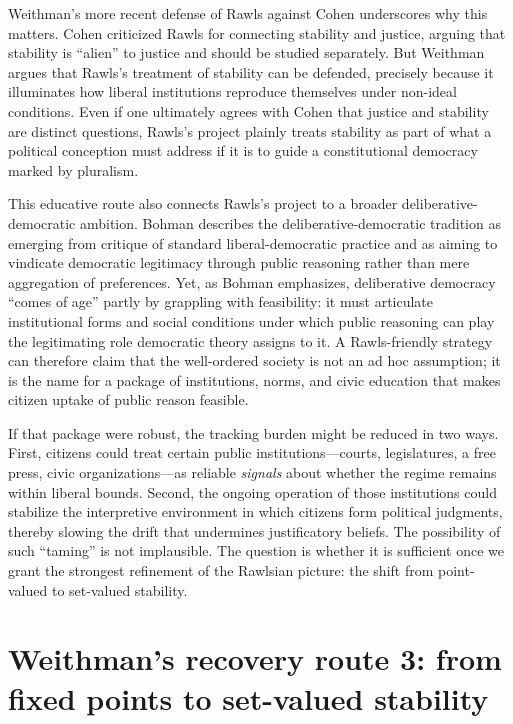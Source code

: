 \documentclass[12pt]{report}
\begin{document}
Weithman’s more recent defense of Rawls against Cohen underscores why this matters. Cohen criticized Rawls for connecting stability and justice, arguing that stability is ``alien'' to justice and should be studied separately. \parencite[p.~1187]{Weithman2024Rescuing} But Weithman argues that Rawls’s treatment of stability can be defended, precisely because it illuminates how liberal institutions reproduce themselves under non-ideal conditions. \parencite[p.~1187]{Weithman2024Rescuing} Even if one ultimately agrees with Cohen that justice and stability are distinct questions, Rawls’s project plainly treats stability as part of what a political conception must address if it is to guide a constitutional democracy marked by pluralism.

This educative route also connects Rawls’s project to a broader deliberative-democratic ambition. Bohman describes the deliberative-democratic tradition as emerging from critique of standard liberal-democratic practice and as aiming to vindicate democratic legitimacy through public reasoning rather than mere aggregation of preferences. \parencite[pp.~400--401]{bohman1998comingage} Yet, as Bohman emphasizes, deliberative democracy ``comes of age'' partly by grappling with feasibility: it must articulate institutional forms and social conditions under which public reasoning can play the legitimating role democratic theory assigns to it. \parencite[pp.~400--403]{bohman1998comingage} A Rawls-friendly strategy can therefore claim that the well-ordered society is not an ad hoc assumption; it is the name for a package of institutions, norms, and civic education that makes citizen uptake of public reason feasible.

If that package were robust, the tracking burden might be reduced in two ways. First, citizens could treat certain public institutions---courts, legislatures, a free press, civic organizations---as reliable \emph{signals} about whether the regime remains within liberal bounds. Second, the ongoing operation of those institutions could stabilize the interpretive environment in which citizens form political judgments, thereby slowing the drift that undermines justificatory beliefs. The possibility of such ``taming'' is not implausible. The question is whether it is sufficient once we grant the strongest refinement of the Rawlsian picture: the shift from point-valued to set-valued stability.

\section{Weithman’s recovery route 3: from fixed points to set-valued stability}
\end{document}
